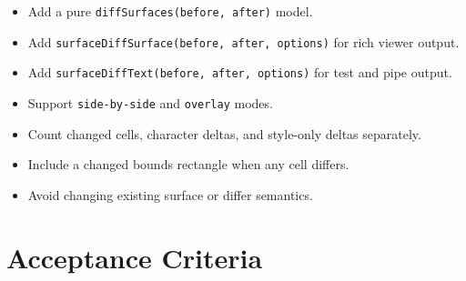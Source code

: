\begin{itemize}
\tightlist
\item
  Add a pure \texttt{d\allowbreak{}i\allowbreak{}f\allowbreak{}f\allowbreak{}S\allowbreak{}u\allowbreak{}r\allowbreak{}f\allowbreak{}a\allowbreak{}c\allowbreak{}e\allowbreak{}s\allowbreak{}(\allowbreak{}b\allowbreak{}e\allowbreak{}f\allowbreak{}o\allowbreak{}r\allowbreak{}e\allowbreak{},\allowbreak{} \allowbreak{}a\allowbreak{}f\allowbreak{}t\allowbreak{}e\allowbreak{}r\allowbreak{})} model.
\item
  Add \texttt{s\allowbreak{}u\allowbreak{}r\allowbreak{}f\allowbreak{}a\allowbreak{}c\allowbreak{}e\allowbreak{}D\allowbreak{}i\allowbreak{}f\allowbreak{}f\allowbreak{}S\allowbreak{}u\allowbreak{}r\allowbreak{}f\allowbreak{}a\allowbreak{}c\allowbreak{}e\allowbreak{}(\allowbreak{}b\allowbreak{}e\allowbreak{}f\allowbreak{}o\allowbreak{}r\allowbreak{}e\allowbreak{},\allowbreak{} \allowbreak{}a\allowbreak{}f\allowbreak{}t\allowbreak{}e\allowbreak{}r\allowbreak{},\allowbreak{} \allowbreak{}o\allowbreak{}p\allowbreak{}t\allowbreak{}i\allowbreak{}o\allowbreak{}n\allowbreak{}s\allowbreak{})} for rich viewer output.
\item
  Add \texttt{s\allowbreak{}u\allowbreak{}r\allowbreak{}f\allowbreak{}a\allowbreak{}c\allowbreak{}e\allowbreak{}D\allowbreak{}i\allowbreak{}f\allowbreak{}f\allowbreak{}T\allowbreak{}e\allowbreak{}x\allowbreak{}t\allowbreak{}(\allowbreak{}b\allowbreak{}e\allowbreak{}f\allowbreak{}o\allowbreak{}r\allowbreak{}e\allowbreak{},\allowbreak{} \allowbreak{}a\allowbreak{}f\allowbreak{}t\allowbreak{}e\allowbreak{}r\allowbreak{},\allowbreak{} \allowbreak{}o\allowbreak{}p\allowbreak{}t\allowbreak{}i\allowbreak{}o\allowbreak{}n\allowbreak{}s\allowbreak{})} for test and pipe output.
\item
  Support \texttt{s\allowbreak{}i\allowbreak{}d\allowbreak{}e\allowbreak{}-\allowbreak{}b\allowbreak{}y\allowbreak{}-\allowbreak{}s\allowbreak{}i\allowbreak{}d\allowbreak{}e} and \texttt{o\allowbreak{}v\allowbreak{}e\allowbreak{}r\allowbreak{}l\allowbreak{}a\allowbreak{}y} modes.
\item
  Count changed cells, character deltas, and style-only deltas separately.
\item
  Include a changed bounds rectangle when any cell differs.
\item
  Avoid changing existing surface or differ semantics.
\end{itemize}

\section{Acceptance Criteria}\label{record-124-acceptance-criteria}

